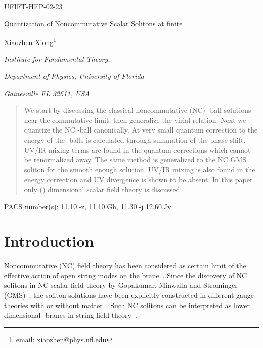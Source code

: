\documentclass[a4paper,a4paper]{article}
\begin{document}
\begin{flushright}    
UFIFT-HEP-02-23 
\end{flushright}
\vskip 1cm

\centerline{\Large Quantization of Noncommutative Scalar Solitons at finite \myHighlight{$\theta$}\coordHE{}}
\vskip 1cm
\centerline{Xiaozhen Xiong\footnote{email: xiaozhen@phys.ufl.edu}}
\date{}
\vskip 0.5cm
\centerline{\it Institute for Fundamental Theory,}
\centerline{\it Department of Physics, University of Florida}
\centerline{\it Gainesville FL 32611, USA}
\vskip 1cm
\begin{abstract}
We start by discussing the classical noncommutative (NC) \coordHE{}-ball solutions 
near the commutative limit, then generalize the virial relation. 
Next we quantize the NC \coordHE{}-ball canonically. At very small \myHighlight{$\theta$}\coordHE{} 
quantum correction to the energy of the \coordHE{}-balls is calculated through 
summation of the phase shift. UV/IR mixing terms are found in the 
quantum corrections which cannot be renormalized away. The same method 
is generalized to the NC GMS soliton for the smooth enough solution. 
UV/IR mixing is also found in the energy correction and UV divergence 
is shown to be absent. In this paper only (\coordHE{}) dimensional scalar field 
theory is discussed. 
\end{abstract}
\vskip 1cm
\noindent PACS number(s): 11.10.-z, 11.10.Gh, 11.30.-j 12.60.Jv
\vskip 1cm
\vskip 1cm

\section{Introduction}

Noncommutative (NC) field theory has been considered as certain limit of 
the effective action of open string modes on the brane~\cite{SW,Connes}. 
Since the discovery of NC solitons in NC scalar field theory 
by Gopakumar, Minwalla and Strominger (GMS)~\cite{GMS}, 
the soliton solutions have been explicitly
constructed in different gauge theories with or without matter~\cite{Nek,Komba}.  
Such NC solitons can be interpreted as lower dimensional \coordHE{}-branes in
string field theory~\cite{MinUnstable,HarveyDbrane}. 
\end{document}
